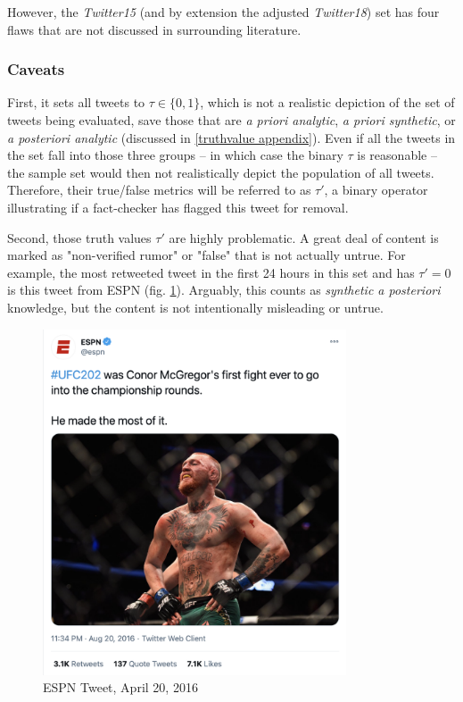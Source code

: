 \documentclass[preprint,review,12pt]{elsarticle}
\begin{document}
 However, the \textit{Twitter15} (and by extension the adjusted \textit{Twitter18}) set has four flaws that are not discussed in surrounding literature. 
 
\subsubsection{Caveats}
First, it sets all tweets to $\tau \in \{0,1\}$, which is not a realistic depiction of the set of tweets being evaluated, save those that are \textit{a priori analytic}, \textit{a priori synthetic}, or \textit{a posteriori analytic} (discussed in \ref{truthvalue appendix}). Even if all the tweets in the set fall into those three groups -- in which case the binary $\tau$ is reasonable -- the sample set would then not realistically depict the population of all tweets. Therefore, their true/false metrics will be referred to as $\tau'$, a binary operator illustrating if a fact-checker has flagged this tweet for removal.

Second, those truth values $\tau'$ are highly problematic. A great deal of content is marked as "non-verified rumor" or "false" that is not actually untrue. For example, the most retweeted tweet in the first 24 hours in this set and has $\tau' = 0$ is this tweet from ESPN (fig. \ref{fig:ESPN Tweet, April 20, 2016}). Arguably, this counts as \textit{synthetic a posteriori} knowledge, but the content is not intentionally misleading or untrue. 
 \begin{figure}[h!]
    \centering
    \includegraphics[width=9cm]{espn Mcgregor tweet.png}
    \caption{ESPN Tweet, April 20, 2016 \cite{espn2016tweet}}
    \label{fig:ESPN Tweet, April 20, 2016}
\end{figure}
\end{document}
